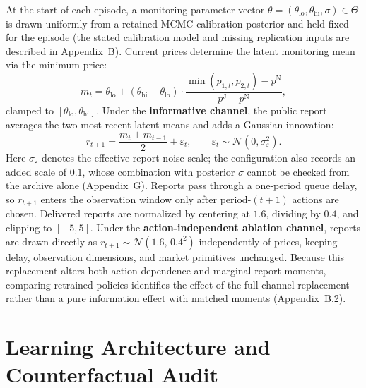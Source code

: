 \documentclass{article}
\begin{document}
At the start of each episode, a monitoring parameter vector $\theta=(\theta_{\mathrm{lo}},\theta_{\mathrm{hi}},\sigma)\in\Theta$ is drawn uniformly from a retained MCMC calibration posterior and held fixed for the episode (the stated calibration model and missing replication inputs are described in Appendix~B). Current prices determine the latent monitoring mean via the minimum price:
\begin{equation}\label{eq:latent}
m_t = \theta_{\mathrm{lo}}
+ (\theta_{\mathrm{hi}}-\theta_{\mathrm{lo}})
\cdot \frac{\min(p_{1,t},p_{2,t})-p^{\mathrm{N}}}
{p^{\mathrm{J}}-p^{\mathrm{N}}},
\end{equation}
clamped to $[\theta_{\mathrm{lo}},\theta_{\mathrm{hi}}]$. Under the \textbf{informative channel}, the public report averages the two most recent latent means and adds a Gaussian innovation:
\begin{equation}\label{eq:report}
r_{t+1} = \frac{m_t + m_{t-1}}{2} + \varepsilon_t,\qquad
\varepsilon_t\sim\mathcal{N}(0,\sigma_\varepsilon^2).
\end{equation}
Here $\sigma_\varepsilon$ denotes the effective report-noise scale; the configuration also records an added scale of $0.1$, whose combination with posterior $\sigma$ cannot be checked from the archive alone (Appendix~G). Reports pass through a one-period queue delay, so $r_{t+1}$ enters the observation window only after period-$(t+1)$ actions are chosen. Delivered reports are normalized by centering at $1.6$, dividing by $0.4$, and clipping to $[-5,5]$. Under the \textbf{action-independent ablation channel}, reports are drawn directly as $r_{t+1}\sim\mathcal{N}(1.6,\,0.4^2)$ independently of prices, keeping delay, observation dimensions, and market primitives unchanged. Because this replacement alters both action dependence and marginal report moments, comparing retrained policies identifies the effect of the full channel replacement rather than a pure information effect with matched moments (Appendix~B.2).

\section{Learning Architecture and Counterfactual Audit}
\end{document}
